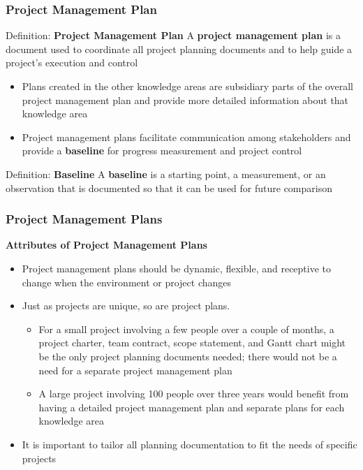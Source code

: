\documentclass[aspectratio=169]{beamer}
\begin{document}
\begin{frame}
\frametitle{Project Management Plan}
\begin{block}{Definition: \textbf{Project Management Plan}}
A \textbf{project management plan} is a document used to coordinate all project planning documents and to help guide a project's execution and control
\end{block}

\begin{itemize}
\item Plans created in the other knowledge areas are subsidiary parts of the overall project management plan and provide more detailed information about that knowledge area
\item Project management plans facilitate communication among stakeholders and provide a \textbf{baseline} for progress measurement and project control
\end{itemize}

\begin{block}{Definition: \textbf{Baseline}}
A \textbf{baseline} is a starting point, a measurement, or an observation that is documented so that it can be used for future comparison
\end{block}
\end{frame}

\begin{frame}
\frametitle{Project Management Plans}
\textbf{Attributes of Project Management Plans}\\
\vspace{0.5cm}
\begin{itemize}
\item Project management plans should be dynamic, flexible, and receptive to change when the environment or project changes
\item Just as projects are unique, so are project plans.
\begin{itemize}
\item For a small project involving a few people over a couple of months, a project charter, team contract, scope statement, and Gantt chart might be the only project planning documents needed; there would not be a need for a separate project management plan
\item A large project involving 100 people over three years would benefit from having a detailed project management plan and separate plans for each knowledge area
\end{itemize}
\item It is important to tailor all planning documentation to fit the needs of specific projects
\end{itemize}
\end{frame}
\end{document}
